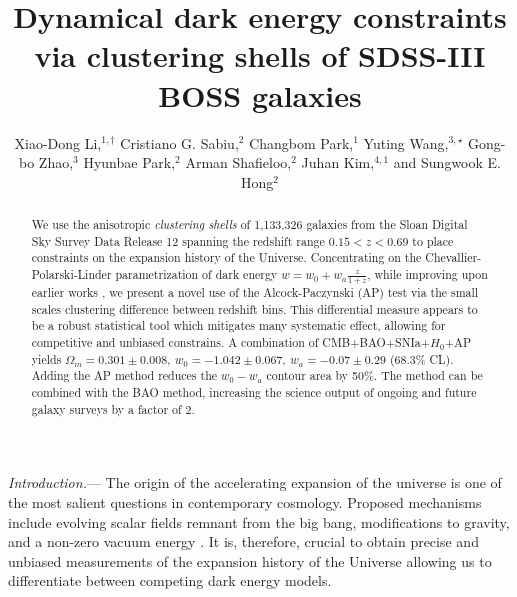 \documentclass[prl,twocolumn,superscriptaddress,aps,amsmath,amssymb,nofootinbib,altaffilletter]{revtex4}
\begin{document}
\title{Dynamical dark energy constraints via clustering shells of SDSS-III BOSS galaxies}

\author{ Xiao-Dong Li,$^{1,\dagger}$
Cristiano G. Sabiu,$^{2}$
Changbom Park,$^{1}$
Yuting Wang,$^{3,\star}$
Gong-bo Zhao,$^{3}$
Hyunbae Park,$^{2}$
Arman Shafieloo,$^{2}$
Juhan Kim,$^{4,1}$
and Sungwook E. Hong$^{2}$}



 

\begin{abstract}
We use the anisotropic {\it clustering shells} of 1,133,326 galaxies from the Sloan Digital Sky Survey Data Release 
12 spanning the redshift range $0.15<z<0.69$ to place constraints on the expansion history of the Universe. 
Concentrating on the Chevallier-Polarski-Linder parametrization of dark energy $w=w_0+w_a\frac{z}{1+z}$,
while improving upon earlier works \citep{Li2016}, 
we present a novel use of the Alcock-Paczynski (AP) test via the small scales clustering difference between redshift bins. 
This differential measure appears to be a robust statistical tool which mitigates many systematic effect, 
allowing for competitive and unbiased constrains. 
A combination of CMB+BAO+SNIa+$H_0$+AP yields
$\Omega_m = 0.301 \pm 0.008,\ w_0 = -1.042 \pm 0.067,\ w_a = -0.07 \pm 0.29$ (68.3\% CL).
Adding the AP method reduces the $w_0-w_a$ contour area by 50\%.
The method can be combined with the BAO method, 
increasing the science output of ongoing and future galaxy surveys by a factor of 2.
\end{abstract}

\maketitle


{\it Introduction.}---
The  origin  of  the  accelerating  expansion  of  the  universe  is  one of  the  most  salient  questions  in  contemporary cosmology. 
Proposed mechanisms include  evolving  scalar  fields  remnant  from  the  big  bang, 
modifications to gravity,  and a  non-zero  vacuum energy \cite[see][for a comprehensive review]{2012IJMPD..2130002Y}. 
It is, therefore, crucial to obtain precise and unbiased measurements of the expansion history of the Universe allowing us to 
differentiate between competing dark energy models.
\end{document}
